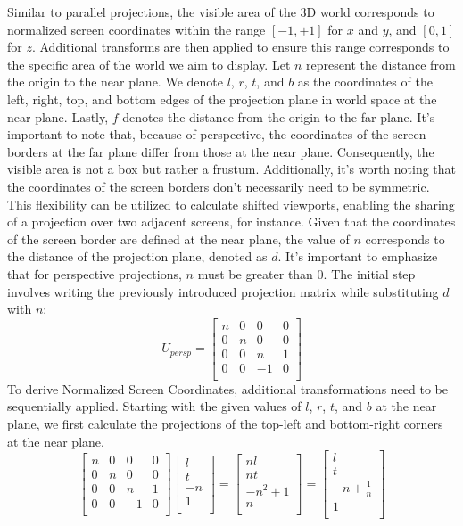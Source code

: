 Similar to parallel projections, the visible area of the 3D world corresponds to normalized screen coordinates within the range $[-1, +1]$ for $x$ and $y$, and $[0, 1]$ for $z$. 
Additional transforms are then applied to ensure this range corresponds to the specific area of the world we aim to display.
Let $n$ represent the distance from the origin to the near plane.
We denote $l$, $r$, $t$, and $b$ as the coordinates of the left, right, top, and bottom edges of the projection plane in world space at the near plane.
Lastly, $f$ denotes the distance from the origin to the far plane.
It's important to note that, because of perspective, the coordinates of the screen borders at the far plane differ from those at the near plane. 
Consequently, the visible area is not a box but rather a frustum.
Additionally, it's worth noting that the coordinates of the screen borders don't necessarily need to be symmetric. 
This flexibility can be utilized to calculate shifted viewports, enabling the sharing of a projection over two adjacent screens, for instance.
Given that the coordinates of the screen border are defined at the near plane, the value of $n$ corresponds to the distance of the projection plane, denoted as $d$.
It's important to emphasize that for perspective projections, $n$ must be greater than $0$.
The initial step involves writing the previously introduced projection matrix while substituting $d$ with $n$:
\[U_{persp}=\begin{bmatrix}
    n & 0 & 0 & 0 \\
    0 & n & 0 & 0 \\
    0 & 0 & n & 1 \\
    0 & 0 & -1 & 0 \\
\end{bmatrix}\]
To derive Normalized Screen Coordinates, additional transformations need to be sequentially applied.
Starting with the given values of $l$, $r$, $t$, and $b$ at the near plane, we first calculate the projections of the top-left and bottom-right corners at the near plane.
\[\begin{bmatrix}
    n & 0 & 0 & 0 \\
    0 & n & 0 & 0 \\
    0 & 0 & n & 1 \\
    0 & 0 & -1 & 0 \\
\end{bmatrix} 
\begin{bmatrix}
    l \\
    t \\
    -n \\
    1 \\
\end{bmatrix} =
\begin{bmatrix}
    nl \\
    nt \\
    -n^2 + 1\\
    n \\
\end{bmatrix}=
\begin{bmatrix}
    l \\
    t \\
    -n + \frac{1}{n}\\
    1 \\
\end{bmatrix}\]
